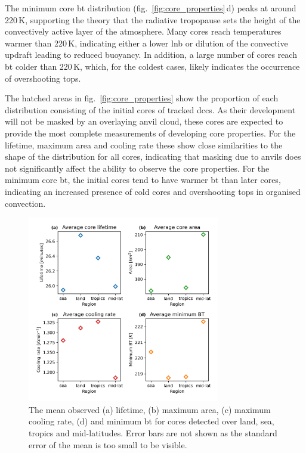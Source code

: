 The minimum core \acrshort{bt} distribution (fig.~\ref{fig:core_properties}\,d) peaks at around 220\,\unit{K}, supporting the theory that the radiative tropopause sets the height of the convectively active layer of the atmosphere.
Many cores reach temperatures warmer than 220\,K, indicating either a lower \acrshort{lnb} or dilution of the convective updraft leading to reduced buoyancy.
In addition, a large number of cores reach \acrshort{bt} colder than 220\,K, which, for the coldest cases, likely indicates the occurrence of overshooting tops.

The hatched areas in fig.~\ref{fig:core_properties} show the proportion of each distribution consisting of the initial cores of tracked \acrshort{dcc}s.
As their development will not be masked by an overlaying anvil cloud, these cores are expected to provide the most complete measurements of developing core properties.
For the lifetime, maximum area and cooling rate these show close similarities to the shape of the distribution for all cores, indicating that masking due to anvils does not significantly affect the ability to observe the core properties.
For the minimum core \acrshort{bt}, the initial cores tend to have warmer \acrshort{bt} than later cores, indicating an increased presence of cold cores and overshooting tops in organised convection.

\begin{figure}[tp]
    \centering
    \includegraphics[width=0.75\textwidth]{figures/chapter2_09.png}
    \caption[
    The mean observed lifetimes, maximum areas, cooling rates and \acrshort{bt} for cores detected over land, sea, tropics and mid-latitudes
    ]{
    The mean observed (a) lifetime, (b) maximum area, (c) maximum cooling rate, (d) and minimum \acrshort{bt} for cores detected over land, sea, tropics and mid-latitudes. Error bars are not shown as the standard error of the mean is too small to be visible.
    }
    \label{fig:core_region_mean_properties}
\end{figure}


